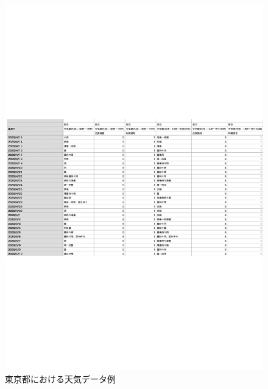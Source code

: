 \begin{figure}[phb]
\centering
\includegraphics[scale=0.8]{exe_wether.pdf}
\caption{東京都における天気データ例}
\end{figure}

